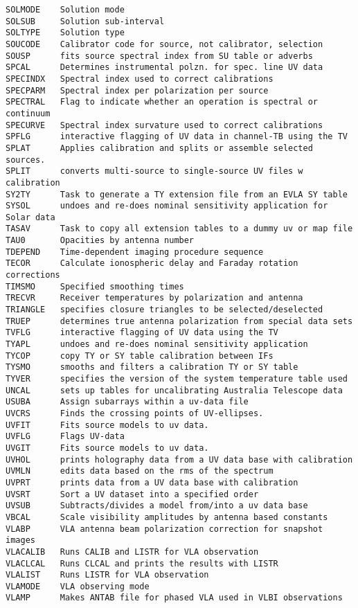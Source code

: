 \begin{verbatim}
SOLMODE    Solution mode
SOLSUB     Solution sub-interval
SOLTYPE    Solution type
SOUCODE    Calibrator code for source, not calibrator, selection
SOUSP      fits source spectral index from SU table or adverbs
SPCAL      Determines instrumental polzn. for spec. line UV data
SPECINDX   Spectral index used to correct calibrations
SPECPARM   Spectral index per polarization per source
SPECTRAL   Flag to indicate whether an operation is spectral or continuum
SPECURVE   Spectral index survature used to correct calibrations
SPFLG      interactive flagging of UV data in channel-TB using the TV
SPLAT      Applies calibration and splits or assemble selected sources.
SPLIT      converts multi-source to single-source UV files w calibration
SY2TY      Task to generate a TY extension file from an EVLA SY table
SYSOL      undoes and re-does nominal sensitivity application for Solar data
TASAV      Task to copy all extension tables to a dummy uv or map file
TAU0       Opacities by antenna number
TDEPEND    Time-dependent imaging procedure sequence
TECOR      Calculate ionospheric delay and Faraday rotation corrections
TIMSMO     Specified smoothing times
TRECVR     Receiver temperatures by polarization and antenna
TRIANGLE   specifies closure triangles to be selected/deselected
TRUEP      determines true antenna polarization from special data sets
TVFLG      interactive flagging of UV data using the TV
TYAPL      undoes and re-does nominal sensitivity application
TYCOP      copy TY or SY table calibration between IFs
TYSMO      smooths and filters a calibration TY or SY table
TYVER      specifies the version of the system temperature table used
UNCAL      sets up tables for uncalibrating Australia Telescope data
USUBA      Assign subarrays within a uv-data file
UVCRS      Finds the crossing points of UV-ellipses.
UVFIT      Fits source models to uv data.
UVFLG      Flags UV-data
UVGIT      Fits source models to uv data.
UVHOL      prints holography data from a UV data base with calibration
UVMLN      edits data based on the rms of the spectrum
UVPRT      prints data from a UV data base with calibration
UVSRT      Sort a UV dataset into a specified order
UVSUB      Subtracts/divides a model from/into a uv data base
VBCAL      Scale visibility amplitudes by antenna based constants
VLABP      VLA antenna beam polarization correction for snapshot images
VLACALIB   Runs CALIB and LISTR for VLA observation
VLACLCAL   Runs CLCAL and prints the results with LISTR
VLALIST    Runs LISTR for VLA observation
VLAMODE    VLA observing mode
VLAMP      Makes ANTAB file for phased VLA used in VLBI observations

\end{verbatim}
